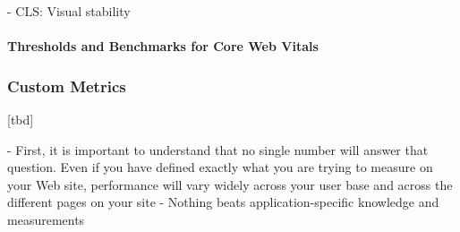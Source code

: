 

- CLS: Visual stability








\paragraph{Thresholds and Benchmarks for Core Web Vitals}







































\subsubsection{Custom Metrics}


[tbd]

- First, it is important to understand that no single number will answer that question. Even if you have defined exactly what you are trying to measure on your Web site, performance will vary widely across your user base and across the different pages on your site
- Nothing beats application-specific knowledge and measurements


